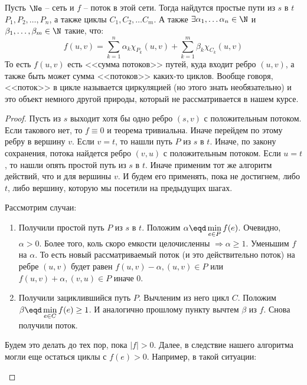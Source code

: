 Пусть $\Ne$ -- сеть и $f$ -- поток в этой сети. Тогда найдутся простые пути из $s$ в $t$ $P_1, P_2, \dots, P_n$, а также циклы $C_1, C_2, \dots C_m$.
А также $\exists \alpha_1, \dots \alpha_n \in \N$ и $\beta_1, \dots, \beta_m \in \N$ такие, что:
\begin{equation*}
    f(u, v) = \sum\limits_{k = 1}^n \alpha_k \chi_{P_k}(u, v) + \sum\limits_{k = 1}^m \beta_k \chi_{C_k}(u, v)
\end{equation*}
То есть $f(u, v)$ есть <<сумма потоков>> путей, куда входит ребро $(u, v)$, а также быть может сумма <<потоков>> каких-то циклов.
Вообще говоря, <<поток>> в цикле называется циркуляцией (но этого знать необязательно) и это объект немного другой природы, который не рассматривается в нашем курсе.
\begin{proof}
    
Пусть из $s$ выходит хотя бы одно ребро $(s, v)$ с положительным потоком. Если такового нет, то $f \equiv 0$ и теорема тривиальна. Иначе перейдем по этому ребру в вершину $v$. 
Если $v = t$, то нашли путь $P$ из $s$ в $t$. Иначе, по закону сохранения, потока найдется ребро $(v, u)$ с положительным потоком. Если $u = t$, то нашли опять простой путь из $s$ в $t$. Иначе применим тот же алгоритм действий, что и для вершины $v$. И будем его применять, пока не достигнем, либо $t$, либо вершину, которую мы посетили на предыдущих шагах.

Рассмотрим случаи:
\begin{enumerate}
    \item Получили простой путь $P$ из $s$ в $t$. Положим $\alpha \eqd \min\limits_{e \in P} f(e)$. Очевидно, $\alpha > 0$. Более того, коль скоро емкости целочисленны $\Rightarrow \alpha \geq 1$. Уменьшим $f$ на $\alpha$. То есть новый рассматриваемый поток (и это действительно поток) на ребре $(u, v)$ будет равен $f(u, v) - \alpha, (u, v) \in P$ или $f(u, v) + \alpha, (v, u) \in P$ иначе $0$.
    \item Получили зациклившийся путь $P$. Вычленим из него цикл $C$. Положим $\beta \eqd \min\limits_{e \in C} f(e) \geq 1$. И аналогично прошлому пункту вычтем $\beta$ из $f$. Снова получили поток.
\end{enumerate}

Будем это делать до тех пор, пока $|f| > 0$. Далее, в следствие нашего алгоритма могли еще остаться циклы с $f(e) > 0$. Например, в такой ситуации:
\begin{figure}[H]
    \centering
\end{figure}
\end{proof}
